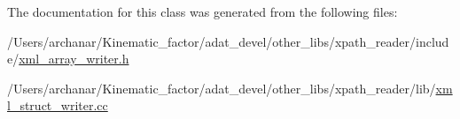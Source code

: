 The documentation for this class was generated from the following files\+:\begin{DoxyCompactItemize}
\item 
/\+Users/archanar/\+Kinematic\+\_\+factor/adat\+\_\+devel/other\+\_\+libs/xpath\+\_\+reader/include/\mbox{\hyperlink{other__libs_2xpath__reader_2include_2xml__array__writer_8h}{xml\+\_\+array\+\_\+writer.\+h}}\item 
/\+Users/archanar/\+Kinematic\+\_\+factor/adat\+\_\+devel/other\+\_\+libs/xpath\+\_\+reader/lib/\mbox{\hyperlink{xml__struct__writer_8cc}{xml\+\_\+struct\+\_\+writer.\+cc}}\end{DoxyCompactItemize}
